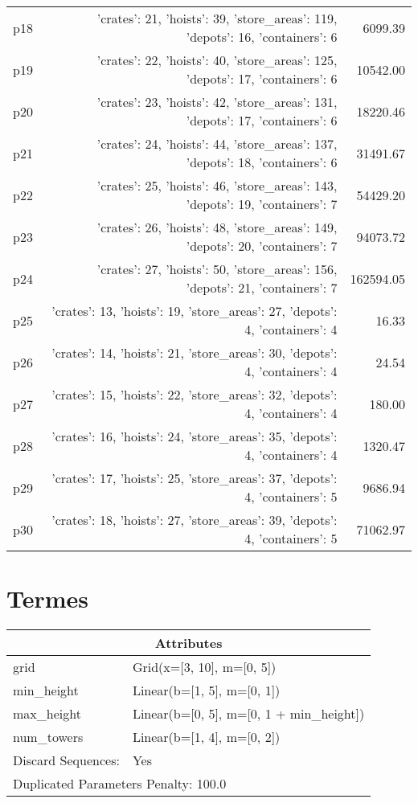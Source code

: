 \documentclass{article}
\begin{document}
\begin{center}
\begin{tabular}{@{}l|r|r@{}}
  p18&{'crates': 21, 'hoists': 39, 'store\_areas': 119, 'depots': 16, 'containers': 6}&6099.39\\
  p19&{'crates': 22, 'hoists': 40, 'store\_areas': 125, 'depots': 17, 'containers': 6}&10542.00\\
  p20&{'crates': 23, 'hoists': 42, 'store\_areas': 131, 'depots': 17, 'containers': 6}&18220.46\\
  p21&{'crates': 24, 'hoists': 44, 'store\_areas': 137, 'depots': 18, 'containers': 6}&31491.67\\
  p22&{'crates': 25, 'hoists': 46, 'store\_areas': 143, 'depots': 19, 'containers': 7}&54429.20\\
  p23&{'crates': 26, 'hoists': 48, 'store\_areas': 149, 'depots': 20, 'containers': 7}&94073.72\\
  p24&{'crates': 27, 'hoists': 50, 'store\_areas': 156, 'depots': 21, 'containers': 7}&162594.05\\
  p25&{'crates': 13, 'hoists': 19, 'store\_areas': 27, 'depots': 4, 'containers': 4}&16.33\\
  p26&{'crates': 14, 'hoists': 21, 'store\_areas': 30, 'depots': 4, 'containers': 4}&24.54\\
  p27&{'crates': 15, 'hoists': 22, 'store\_areas': 32, 'depots': 4, 'containers': 4}&180.00\\
  p28&{'crates': 16, 'hoists': 24, 'store\_areas': 35, 'depots': 4, 'containers': 4}&1320.47\\
  p29&{'crates': 17, 'hoists': 25, 'store\_areas': 37, 'depots': 4, 'containers': 5}&9686.94\\
  p30&{'crates': 18, 'hoists': 27, 'store\_areas': 39, 'depots': 4, 'containers': 5}&71062.97
                            \end{tabular}
                            \end{center}
                    
                            \newpage \section{Termes}
                    \begin{center}
                    \begin{tabular}{@{}p{}p{}@{}}
                    \multicolumn{2}{c}{\bf \large Attributes}\\\midrule
                    grid & Grid(x=[3, 10], m=[0, 5])\\
min\_height & Linear(b=[1, 5], m=[0, 1])\\
max\_height & Linear(b=[0, 5], m=[0, 1 + min\_height])\\
num\_towers & Linear(b=[1, 4], m=[0, 2])
                                \\\midrule
                                Discard Sequences: & Yes \\\midrule
                    \multicolumn{2}{l}{Duplicated Parameters Penalty: 100.0}
                    \end{tabular}
                    \end{center}
                
\end{document}
